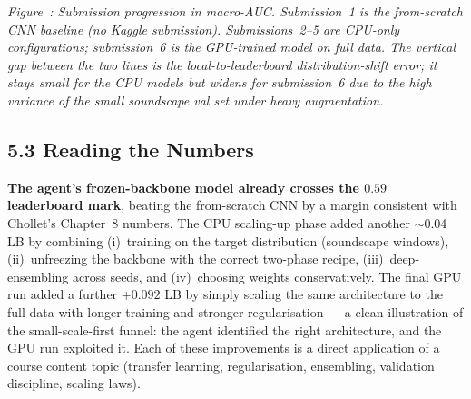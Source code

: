 \documentclass[11pt,a4paper]{article}
\begin{document}
\begin{center}
\end{center}
\label{fig:progress}
\textit{Figure~\thefigure: Submission progression in macro-AUC. Submission~1 is the from-scratch CNN baseline (no Kaggle submission). Submissions~2--5 are CPU-only configurations; submission~6 is the GPU-trained model on full data. The vertical gap between the two lines is the local-to-leaderboard distribution-shift error; it stays small for the CPU models but widens for submission~6 due to the high variance of the small soundscape val set under heavy augmentation.}

\subsection*{5.3 Reading the Numbers}

\textbf{The agent's frozen-backbone model already crosses the $0.59$ leaderboard mark}, beating the from-scratch CNN by a margin consistent with Chollet's Chapter~8 numbers. The CPU scaling-up phase added another $\sim$0.04 LB by combining (i)~training on the target distribution (soundscape windows), (ii)~unfreezing the backbone with the correct two-phase recipe, (iii)~deep-ensembling across seeds, and (iv)~choosing weights conservatively. The final GPU run added a further $+0.092$ LB by simply scaling the same architecture to the full data with longer training and stronger regularisation --- a clean illustration of the small-scale-first funnel: the agent identified the right architecture, and the GPU run exploited it. Each of these improvements is a direct application of a course content topic (transfer learning, regularisation, ensembling, validation discipline, scaling laws).
\end{document}
